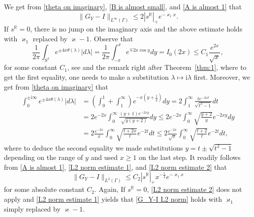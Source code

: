 \documentclass[a4paper,10pt,leqno]{amsart}
\numberwithin{equation}{subsection}
\theoremstyle{plain}
\theoremstyle{definition}
\theoremstyle{remark}
\theoremstyle{case}
\newcommand{\R}{\mathbb R}
\newcommand{\ii}{\mathrm{i}}
\begin{document}
We get from \eqref{theta on imaginary}, \eqref{B is almost small}, and \eqref{A is almost 1} that
\begin{equation}
\label{G_Y-I infinity norm}
\|G_Y-I\|_{L^\infty(\Gamma)} \leq 2|s^\R|_+ e^{-\varkappa_1x}.
\end{equation}
If \( s^\R=0\), there is no jump on the imaginary axis and the above estimate holds with \( \varkappa_1 \) replaced by \( \varkappa-1\). Observe that
\begin{equation}
\label{L2 norm estimate 1}
\frac1{2\pi}\int_{S^1} e^{\pm 4x\theta(\lambda)}|d\lambda| = \frac1{2\pi}\int_{-\pi}^\pi e^{\mp 2x\cos y}dy =  I_0(2x) \leq C_1\frac{e^{2x}}{\sqrt x},
\end{equation}
for some constant \( C_1 \), see \cite[(10.32.1)]{NIST:DLMF} and the remark right after Theorem~\ref{thm:1}, where to get the first equality, one needs to make a substitution \( \lambda \mapsto \ii\lambda \) first. Moreover, we get from \eqref{theta on imaginary} that
\begin{align}
\int_0^{\pm\ii\infty} e^{\pm 4x\theta(\lambda)}|d\lambda| & = \left(\int_0^1 + \int_1^\infty\right) e^{-x(y + \frac{1}{y})} dy = 2\int_1^\infty \frac{t e^{-2xt}}{\sqrt{t^2-1}}dt \\
& = 2e^{-2x}\int_0^\infty \frac{(y+1)e^{-2x y}}{\sqrt{y(y+2)}}dy \leq 2e^{-2x}\int_0^\infty \sqrt{\frac{y+2}{y}} e^{-2x y}dy \\
& = 2\frac{e^{-2x}}{x} \int_0^\infty \sqrt{\frac{t+2x}t} e^{-2t}dt \leq 2\frac{e^{-2x}}{\sqrt x} \int_0^\infty \sqrt{\frac{t+2}t} e^{-2t}dt,
\label{L2 norm estimate 2}
\end{align}
where to deduce the second equality we made substitutions \( y=t\pm\sqrt{t^2-1}\) depending on the range of \( y \) and used \( x\geq1 \) on the last step. It readily follows from \eqref{A is almost 1}, \eqref{L2 norm estimate 1}, and \eqref{L2 norm estimate 2} that
\begin{equation}
\label{G_Y-I L2 norm}
\| G_Y - I \|_{L^2(\Gamma)} \leq C_2 |s^\R|_+ x^{-\frac14}e^{-\varkappa_1x}
\end{equation}
for some absolute constant \( C_2 \). Again, If \( s^\R=0\), \eqref{L2 norm estimate 2} does not apply and \eqref{L2 norm estimate 1} yields that \eqref{G_Y-I L2 norm} holds with \( \varkappa_1 \) simply replaced by \( \varkappa-1\). 
\end{document}
